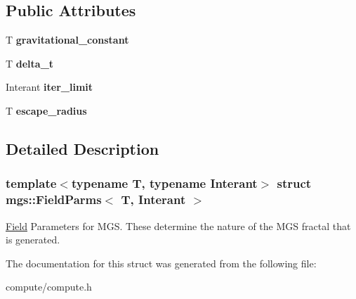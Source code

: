 \subsection*{Public Attributes}
\begin{DoxyCompactItemize}
\item 
\mbox{\label{structmgs_1_1FieldParms_ac087d3d0e4e9d1aa8e9290610327d7f9}} 
T {\bfseries gravitational\+\_\+constant}
\item 
\mbox{\label{structmgs_1_1FieldParms_a46eea5527c0fd40eadcd377dd5b8d97d}} 
T {\bfseries delta\+\_\+t}
\item 
\mbox{\label{structmgs_1_1FieldParms_a4ad3c8d11a2f695b89bccbc02d1cb0c5}} 
Interant {\bfseries iter\+\_\+limit}
\item 
\mbox{\label{structmgs_1_1FieldParms_ab28959482fd11ba2eb1e37f842d26e8a}} 
T {\bfseries escape\+\_\+radius}
\end{DoxyCompactItemize}


\subsection{Detailed Description}
\subsubsection*{template$<$typename T, typename Interant$>$\newline
struct mgs\+::\+Field\+Parms$<$ T, Interant $>$}

\hyperlink{structmgs_1_1Field}{Field} Parameters for M\+GS. These determine the nature of the M\+GS fractal that is generated. 

The documentation for this struct was generated from the following file\+:\begin{DoxyCompactItemize}
\item 
compute/compute.\+h\end{DoxyCompactItemize}
